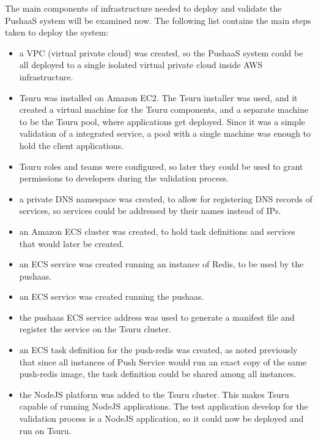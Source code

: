 The main components of infrastructure needed to deploy and validate the PushaaS system will be examined now. The following list contains the main steps taken to deploy the system:
\begin{itemize}
    \item a VPC (virtual private cloud) was created, so the PushaaS system could be all deployed to a single isolated virtual private cloud inside AWS infrastructure.
    \item Tsuru was installed on Amazon EC2. The Tsuru installer was used, and it created a virtual machine for the Tsuru components, and a separate machine to be the Tsuru pool, where applications get deployed. Since it was a simple validation of a integrated service, a pool with a single machine was enough to hold the client applications.
    \item Tsuru roles and teams were configured, so later they could be used to grant permissions to developers during the validation process.
    \item a private DNS namespace was created, to allow for registering DNS records of services, so services could be addressed by their names instead of IPs.
    \item an Amazon ECS cluster was created, to hold task definitions and services that would later be created.
    \item an ECS service was created running an instance of Redis, to be used by the pushaas.
    \item an ECS service was created running the pushaas.
    \item the pushaas ECS service address was used to generate a manifest file and register the service on the Tsuru cluster.
    \item an ECS task definition for the push-redis was created, as noted previously that since all instances of Push Service would run an exact copy of the same push-redis image, the task definition could be shared among all instances.
    \item the NodeJS platform was added to the Tsuru cluster. This makes Tsuru capable of running NodeJS applications. The test application develop for the validation process is a NodeJS application, so it could now be deployed and run on Tsuru.
\end{itemize}
